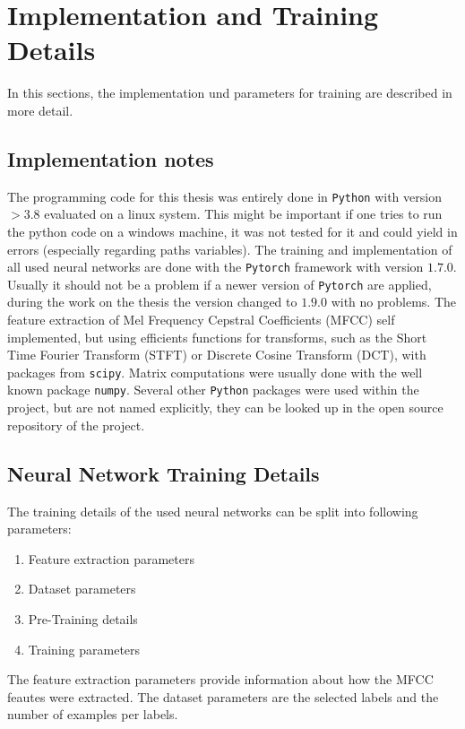 
\section{Implementation and Training Details}\label{sec:exp_details}
\thesisStateNotReady
In this sections, the implementation und parameters for training are described in more detail.


\subsection{Implementation notes}\label{sec:exp_details_implementation}
The programming code for this thesis was entirely done in \texttt{Python} with version $>3.8$ evaluated on a linux system.
This might be important if one tries to run the python code on a windows machine, it was not tested for it and could yield in errors (especially regarding paths variables).
The training and implementation of all used neural networks are done with the \texttt{Pytorch} \cite{Pytorch} framework with version $1.7.0$. 
Usually it should not be a problem if a newer version of \texttt{Pytorch} are applied, during the work on the thesis the version changed to $1.9.0$ with no problems.
The feature extraction of Mel Frequency Cepstral Coefficients (MFCC) self implemented, but using efficients functions for transforms, such as the Short Time Fourier Transform (STFT) or Discrete Cosine Transform (DCT), with packages from \texttt{scipy}.
Matrix computations were usually done with the well known package \texttt{numpy}.
Several other \texttt{Python} packages were used within the project, but are not named explicitly, they can be looked up in the open source repository of the project.



\subsection{Neural Network Training Details}\label{sec:exp_details_training}
The training details of the used neural networks can be split into following parameters:
\begin{enumerate}
  \item Feature extraction parameters
  \item Dataset parameters
  \item Pre-Training details
  \item Training parameters
\end{enumerate}
The feature extraction parameters provide information about how the MFCC feautes were extracted.
The dataset parameters are the selected labels and the number of examples per labels.

